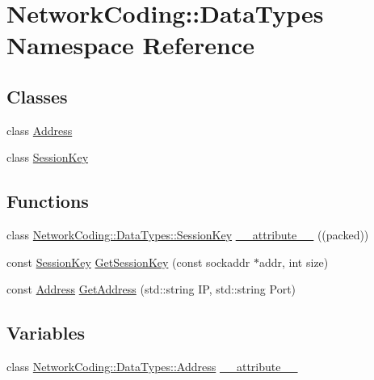 \hypertarget{namespace_network_coding_1_1_data_types}{}\section{Network\+Coding\+:\+:Data\+Types Namespace Reference}
\label{namespace_network_coding_1_1_data_types}
\subsection*{Classes}
\begin{DoxyCompactItemize}
\item 
class \hyperlink{class_network_coding_1_1_data_types_1_1_address}{Address}
\item 
class \hyperlink{class_network_coding_1_1_data_types_1_1_session_key}{Session\+Key}
\end{DoxyCompactItemize}
\subsection*{Functions}
\begin{DoxyCompactItemize}
\item 
class \hyperlink{class_network_coding_1_1_data_types_1_1_session_key}{Network\+Coding\+::\+Data\+Types\+::\+Session\+Key} \hyperlink{namespace_network_coding_1_1_data_types_a25cc3e477976cfec87b561ec17caf12b}{\+\_\+\+\_\+attribute\+\_\+\+\_\+} ((packed))
\item 
const \hyperlink{class_network_coding_1_1_data_types_1_1_session_key}{Session\+Key} \hyperlink{namespace_network_coding_1_1_data_types_a712da07467eaf2a7eddf77343953e6d6}{Get\+Session\+Key} (const sockaddr $\ast$addr, int size)
\item 
const \hyperlink{class_network_coding_1_1_data_types_1_1_address}{Address} \hyperlink{namespace_network_coding_1_1_data_types_a2824c02e4a872dac64a9b10530702034}{Get\+Address} (std\+::string IP, std\+::string Port)
\end{DoxyCompactItemize}
\subsection*{Variables}
\begin{DoxyCompactItemize}
\item 
class \hyperlink{class_network_coding_1_1_data_types_1_1_address}{Network\+Coding\+::\+Data\+Types\+::\+Address} \hyperlink{namespace_network_coding_1_1_data_types_a6987aee7d05b7ec7eb348e80d37b9c3a}{\+\_\+\+\_\+attribute\+\_\+\+\_\+}
\end{DoxyCompactItemize}


